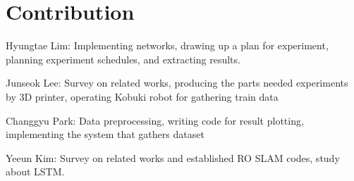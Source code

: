 \documentclass[letterpaper, 10 pt, conference]{ieeeconf}  %
\begin{document}



\section{Contribution}

Hyungtae Lim: Implementing networks, drawing up a plan for experiment, planning experiment schedules, and extracting results.

Junseok Lee: Survey on related works, producing the parts needed experiments by 3D printer, operating Kobuki robot for gathering train data

Changgyu Park: Data preprocessing, writing code for result plotting, implementing the system that gathers dataset 

Yeeun Kim: Survey on related works and established RO SLAM codes, study about LSTM.
\end{document}

